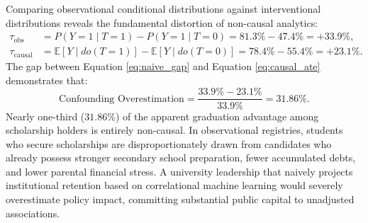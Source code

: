 Comparing observational conditional distributions against interventional distributions reveals the fundamental distortion of non-causal analytics:
\begin{align}
    \tau_{\text{obs}} &= P(Y=1 \mid T=1) - P(Y=1 \mid T=0) = 81.3\% - 47.4\% = \mathbf{+33.9\%}, \label{eq:naive_gap} \\
    \tau_{\text{causal}} &= \mathbb{E}[Y \mid do(T=1)] - \mathbb{E}[Y \mid do(T=0)] = 78.4\% - 55.4\% = \mathbf{+23.1\%}. \label{eq:causal_ate}
\end{align}
The gap between Equation \eqref{eq:naive_gap} and Equation \eqref{eq:causal_ate} demonstrates that:
\begin{equation}
    \text{Confounding Overestimation} = \frac{33.9\% - 23.1\%}{33.9\%} = \mathbf{31.86\%}.
    \label{eq:confounding_fraction}
\end{equation}
Nearly one-third ($31.86\%$) of the apparent graduation advantage among scholarship holders is entirely non-causal. In observational registries, students who secure scholarships are disproportionately drawn from candidates who already possess stronger secondary school preparation, fewer accumulated debts, and lower parental financial stress. A university leadership that naively projects institutional retention based on correlational machine learning would severely overestimate policy impact, committing substantial public capital to unadjusted associations.
